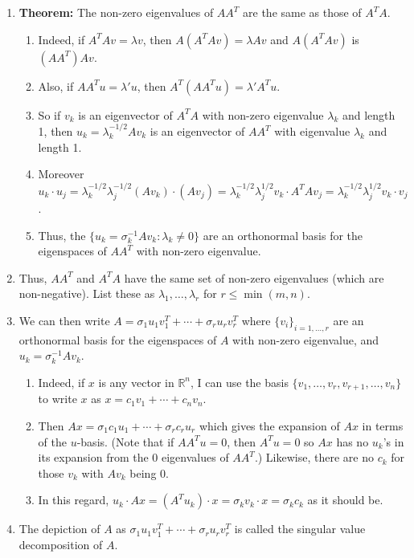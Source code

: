 \documentclass[12pt,letterpaper]{article}
\begin{document}
\begin{enumerate}
    \item \textbf{Theorem:} The non-zero eigenvalues of $A A^T$ are the same as those of $A^T A$.
    \begin{enumerate}    \setlength{\itemsep}{5em}

        \item Indeed, if $A^T A v = \lambda v$, then $A (A^T A v) = \lambda A v$ and $A (A^T A v)$ is $(A A^T) A v$.
        \item Also, if $A A^T u = \lambda' u$, then $A^T (A A^T u) = \lambda' A^T u$.
        \item So if $v_k$ is an eigenvector of $A^T A$ with non-zero eigenvalue $\lambda_k$ and length 1, then $u_k = \lambda_k^{-1/2} A v_k$ is an eigenvector of $A A^T$ with eigenvalue $\lambda_k$ and length 1.
        \item Moreover $u_k \cdot u_j = \lambda_k^{-1/2} \lambda_j^{-1/2} (A v_k) \cdot (A v_j) = \lambda_k^{-1/2} \lambda_j^{1/2} v_k \cdot A^T A v_j = \lambda_k^{-1/2} \lambda_j^{1/2} v_k \cdot v_j$.
        \item Thus, the $\{ u_k = \sigma_k^{-1} A v_k : \lambda_k \neq 0\}$ are an orthonormal basis for the eigenspaces of $A A^T$ with non-zero eigenvalue.
    \end{enumerate}

\newpage     \setlength{\itemsep}{7em}


    \item Thus, $A A^T$ and $A^T A$ have the same set of non-zero eigenvalues (which are non-negative). List these as $\lambda_1, \dots, \lambda_r$ for $r \leq \min(m, n)$.
    \item We can then write $A = \sigma_1 u_1 v_1^T + \cdots + \sigma_r u_r v_r^T$ where $\{v_i\}_{i=1,\dots,r}$ are an orthonormal basis for the eigenspaces of $A$ with non-zero eigenvalue, and $u_k = \sigma_k^{-1} A v_k$.
    \begin{enumerate}    \setlength{\itemsep}{5em}

        \item Indeed, if $x$ is any vector in $\mathbb{R}^n$, I can use the basis $\{v_1, \dots, v_r, v_{r+1}, \dots, v_n\}$ to write $x$ as $x = c_1 v_1 + \cdots + c_n v_n$.
        \item Then $A x = \sigma_1 c_1 u_1 + \cdots + \sigma_r c_r u_r$ which gives the expansion of $A x$ in terms of the $u$-basis. (Note that if $A A^T u = 0$, then $A^T u = 0$ so $A x$ has no $u_k$'s in its expansion from the 0 eigenvalues of $A A^T$.) Likewise, there are no $c_k$ for those $v_k$ with $A v_k$ being 0.
        \item In this regard, $u_k \cdot A x = (A^T u_k) \cdot x = \sigma_k v_k \cdot x = \sigma_k c_k$ as it should be.
    \end{enumerate}

    \item The depiction of $A$ as $\sigma_1 u_1 v_1^T + \cdots + \sigma_r u_r v_r^T$ is called the singular value decomposition of $A$.

\end{enumerate}
\newpage
\end{document}
